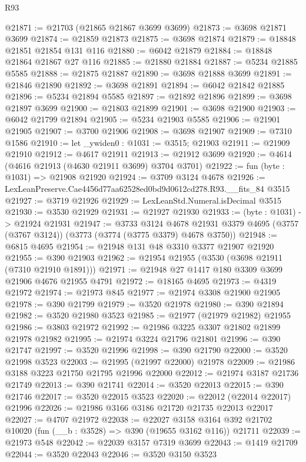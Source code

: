 \begin{lexlean}{R93}
\begin{coremodule}
@21871 := @21703 (@21865 @21867 @3699 @3699)
@21873 := @3698 @21871 @3699
@21874 := @21859 @21873
@21875 := @3698 @21874
@21879 := @18848 @21851 @21854 @131 @116
@21880 := @6042 @21879
@21884 := @18848 @21864 @21867 @27 @116
@21885 := @21880 @21884
@21887 := @5234 @21885 @5585
@21888 := @21875 @21887
@21890 := @3698 @21888 @3699
@21891 := @21846 @21890
@21892 := @3698 @21891
@21894 := @6042 @21842 @21885
@21896 := @5234 @21894 @5585
@21897 := @21892 @21896
@21899 := @3698 @21897 @3699
@21900 := @21803 @21899
@21901 := @3698 @21900
@21903 := @6042 @21799 @21894
@21905 := @5234 @21903 @5585
@21906 := @21901 @21905
@21907 := @3700 @21906
@21908 := @3698 @21907
@21909 := @7310 @1586
@21910 := let _ywiden0 : @1031 := @3515; @21903
@21911 := @21909 @21910
@21912 := @4617 @21911
@21913 := @21912 @3699
@21920 := @4614 (@4616 @21913 (@4630 @21911 @3699) @3704 @3701)
@21922 := fun (byte : @1031) => @21908 @21920
@21924 := @3709 @3124 @4678
@21926 := LexLeanPreserve.Cae4456d77aa62528ed0bd9d0612cd278.R93.__fits_84 @3515
@21927 := @3719 @21926
@21929 := LexLeanStd.Numeral.isDecimal @3515
@21930 := @3530 @21929
@21931 := @21927 @21930
@21933 := (byte : @1031) -> @21924 @21931
@21947 := @3733
    @3124
    @4678
    @21931
    @3379
    @4695
    (@3757 (@3767 @3124))
    (@3773 (@3774 (@3775 @3379) @4678 @3750))
@21948 := @6815 @4695
@21954 := @21948 @131 @48 @3310 @3377 @21907 @21920
@21955 := @390 @21903
@21962 := @21954 @21955 (@3530 (@3698 @21911 (@7310 @21910 @1891)))
@21971 := @21948 @27 @1417 @180 @3309 @3699 @21906 @4676 @21955 @4791
@21972 := @18165 @4695
@21973 := @4319 @21972
@21974 := @21973 @845
@21977 := @21974 @3308 @21900 @21905
@21978 := @390 @21799
@21979 := @3520 @21978
@21980 := @390 @21894
@21982 := @3520 @21980 @3523
@21985 := @21977 (@21979 @21982) @21955
@21986 := @3803 @21972
@21992 := @21986 @3225 @3307 @21802 @21899 @21978 @21982
@21995 := @21974 @3224 @21796 @21801
@21996 := @390 @21747
@21997 := @3520 @21996
@21998 := @390 @21790
@22000 := @3520 @21998 @3523
@22003 := @21995 (@21997 @22000) @21978
@22009 := @21986 @3188 @3223 @21750 @21795 @21996 @22000
@22012 := @21974 @3187 @21736 @21749
@22013 := @390 @21741
@22014 := @3520 @22013
@22015 := @390 @21746
@22017 := @3520 @22015 @3523
@22020 := @22012 (@22014 @22017) @21996
@22026 := @21986 @3166 @3186 @21720 @21735 @22013 @22017
@22027 := @4707 @21972
@22038 := @22027
    @3158
    @3164
    @392
    @21702
    @10020
    (fun (__b : @3528) => @390 (@19655 @3162 @116))
    @21711
@22039 := @21973 @548
@22042 := @22039 @3157 @7319 @3699
@22043 := @1419 @21709
@22044 := @3520 @22043
@22046 := @3520 @3150 @3523

\end{coremodule}
\end{lexlean}
